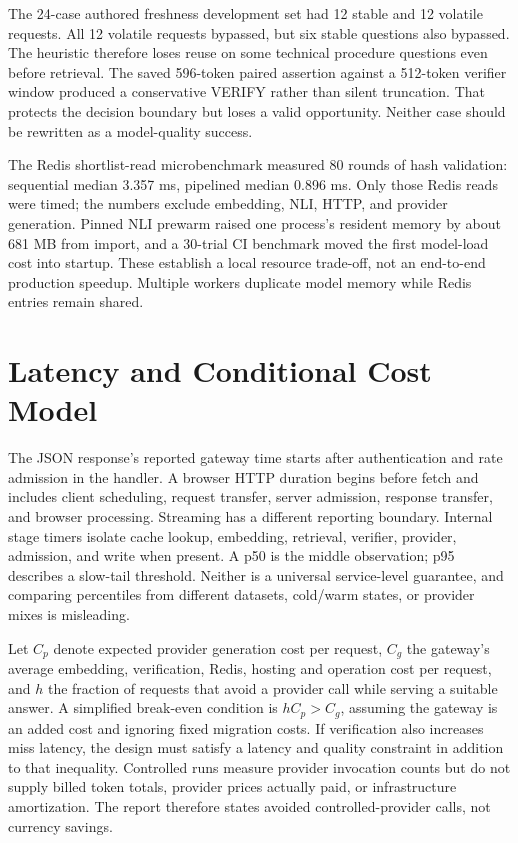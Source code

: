 The 24-case authored freshness development set had 12 stable and 12 volatile requests. All 12 volatile requests bypassed, but six stable questions also bypassed. The heuristic therefore loses reuse on some technical procedure questions even before retrieval. The saved 596-token paired assertion against a 512-token verifier window produced a conservative VERIFY rather than silent truncation. That protects the decision boundary but loses a valid opportunity. Neither case should be rewritten as a model-quality success.

The Redis shortlist-read microbenchmark measured 80 rounds of hash validation: sequential median 3.357 ms, pipelined median 0.896 ms. Only those Redis reads were timed; the numbers exclude embedding, NLI, HTTP, and provider generation. Pinned NLI prewarm raised one process's resident memory by about 681 MB from import, and a 30-trial CI benchmark moved the first model-load cost into startup. These establish a local resource trade-off, not an end-to-end production speedup. Multiple workers duplicate model memory while Redis entries remain shared.

\section{Latency and Conditional Cost Model}
The JSON response's reported gateway time starts after authentication and rate admission in the handler. A browser HTTP duration begins before fetch and includes client scheduling, request transfer, server admission, response transfer, and browser processing. Streaming has a different reporting boundary. Internal stage timers isolate cache lookup, embedding, retrieval, verifier, provider, admission, and write when present. A p50 is the middle observation; p95 describes a slow-tail threshold. Neither is a universal service-level guarantee, and comparing percentiles from different datasets, cold/warm states, or provider mixes is misleading.

Let \(C_p\) denote expected provider generation cost per request, \(C_g\) the gateway's average embedding, verification, Redis, hosting and operation cost per request, and \(h\) the fraction of requests that avoid a provider call while serving a suitable answer. A simplified break-even condition is \(h C_p > C_g\), assuming the gateway is an added cost and ignoring fixed migration costs. If verification also increases miss latency, the design must satisfy a latency and quality constraint in addition to that inequality. Controlled runs measure provider invocation counts but do not supply billed token totals, provider prices actually paid, or infrastructure amortization. The report therefore states avoided controlled-provider calls, not currency savings.

